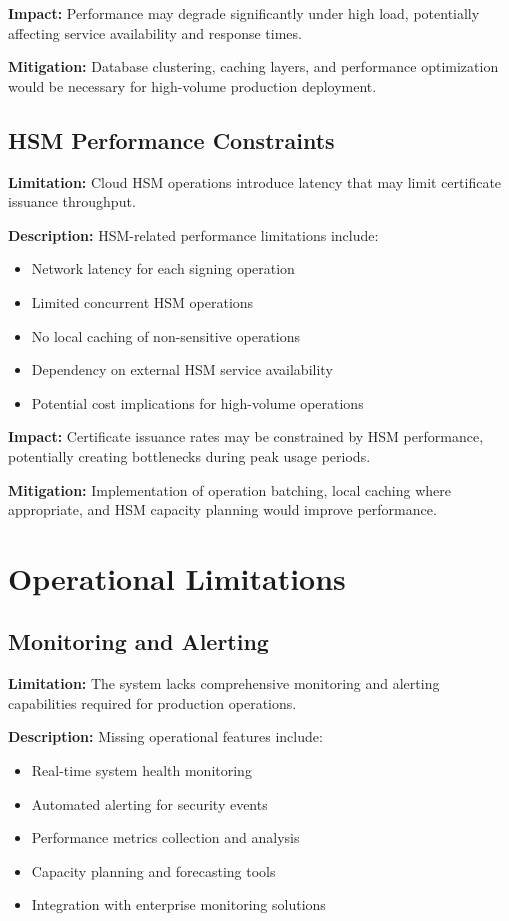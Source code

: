 \textbf{Impact:} Performance may degrade significantly under high load, potentially affecting service availability and response times.

\textbf{Mitigation:} Database clustering, caching layers, and performance optimization would be necessary for high-volume production deployment.

\subsection{HSM Performance Constraints}

\textbf{Limitation:} Cloud HSM operations introduce latency that may limit certificate issuance throughput.

\textbf{Description:} HSM-related performance limitations include:
\begin{itemize}
    \item Network latency for each signing operation
    \item Limited concurrent HSM operations
    \item No local caching of non-sensitive operations
    \item Dependency on external HSM service availability
    \item Potential cost implications for high-volume operations
\end{itemize}

\textbf{Impact:} Certificate issuance rates may be constrained by HSM performance, potentially creating bottlenecks during peak usage periods.

\textbf{Mitigation:} Implementation of operation batching, local caching where appropriate, and HSM capacity planning would improve performance.

\section{Operational Limitations}

\subsection{Monitoring and Alerting}

\textbf{Limitation:} The system lacks comprehensive monitoring and alerting capabilities required for production operations.

\textbf{Description:} Missing operational features include:
\begin{itemize}
    \item Real-time system health monitoring
    \item Automated alerting for security events
    \item Performance metrics collection and analysis
    \item Capacity planning and forecasting tools
    \item Integration with enterprise monitoring solutions
\end{itemize}

